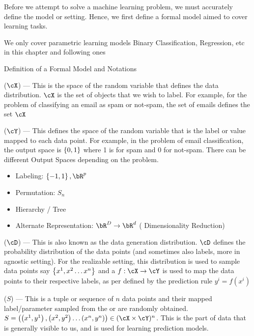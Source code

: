 \documentclass[11pt,a4paper]{article}
\begin{document}
\makeheader%

Before we attempt to solve a machine learning problem, we must accurately define the model or setting. Hence, we first define a formal model aimed to cover learning tasks.

We only cover parametric learning models  Binary Classification, Regression, etc in this chapter and following ones

\begin{ssection}{Definition of a Formal Model and Notations}

	\begin{enumerate}[label=\bt{\theenumi.}]
		 ($\cX$) --- This is the space of the random variable that defines the data distribution. $\cX$ is the set of objects that we wish to label. For example, for the problem of classifying an email as spam or not-spam, the set of emails defines the set $\cX$ \sbr

		 ($\cY$) --- This defines the space of the random variable that is the label or value mapped to each data point. For example, in the problem of email classification, the output space is $\left\{ {0, 1} \right\}$ where 1 is for spam and 0 for not-spam. There can be different Output Spaces depending on the problem.

			\begin{itemize}[label=-\;]
				\item Labeling: $\set{-1, 1}, \bR^p$
				\item Permutation: $S_n$
				\item Hierarchy / Tree
				\item Alternate Representation: $\bR^D \ra \bR^d$ ( Dimensionality Reduction)
			\end{itemize} \sbr

		\ditem[Distribution] ($\cD$) --- This is also known as the data generation distribution. $\cD$ defines the probability distribution of the data points (and sometimes also labels, more in agnostic setting). For the realizable setting, this distribution is used to sample data points say $\left\{ {x^1, x^2 \dots x^n} \right\}$ and a  $f : \cX \ra \cY$ is used to map the data points to their respective labels, as per defined by the prediction rule  $y^i = f(x^i)$

		 ($S$) --- This is a tuple or sequence of $n$ data points and their mapped label/parameter sampled from the  or are randomly obtained. $S = \para{\para{x^1, y^1}, \para{x^2, y^2} \dots \para{x^n, y^n}} \in (\cX \times \cY)^n$. This is the part of data that is generally visible to us, and is used for learning prediction models.


\end{enumerate}
\end{ssection}
\end{document}
